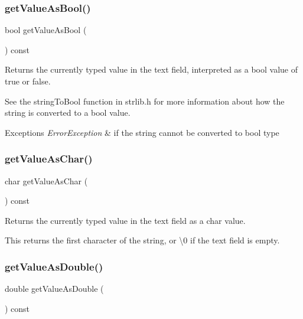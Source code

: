 \subsubsection{\texorpdfstring{get\+Value\+As\+Bool()}{getValueAsBool()}}
{\footnotesize\ttfamily bool get\+Value\+As\+Bool (\begin{DoxyParamCaption}{ }\end{DoxyParamCaption}) const\hspace{0.3cm}{\ttfamily [virtual]}}



Returns the currently typed value in the text field, interpreted as a bool value of true or false. 

See the string\+To\+Bool function in strlib.\+h for more information about how the string is converted to a bool value. 
\begin{DoxyExceptions}{Exceptions}
{\em Error\+Exception} & if the string cannot be converted to bool type \\
\hline
\end{DoxyExceptions}
\mbox{\label{classGTextField_a562f514fc055aaa37ca3145fc7abde8e}} 
\subsubsection{\texorpdfstring{get\+Value\+As\+Char()}{getValueAsChar()}}
{\footnotesize\ttfamily char get\+Value\+As\+Char (\begin{DoxyParamCaption}{ }\end{DoxyParamCaption}) const\hspace{0.3cm}{\ttfamily [virtual]}}



Returns the currently typed value in the text field as a char value. 

This returns the first character of the string, or \textquotesingle{}\textbackslash{}0\textquotesingle{} if the text field is empty. \mbox{\label{classGTextField_aab9a19edbd1548d557721e0b695295f8}} 
\subsubsection{\texorpdfstring{get\+Value\+As\+Double()}{getValueAsDouble()}}
{\footnotesize\ttfamily double get\+Value\+As\+Double (\begin{DoxyParamCaption}{ }\end{DoxyParamCaption}) const\hspace{0.3cm}{\ttfamily [virtual]}}



